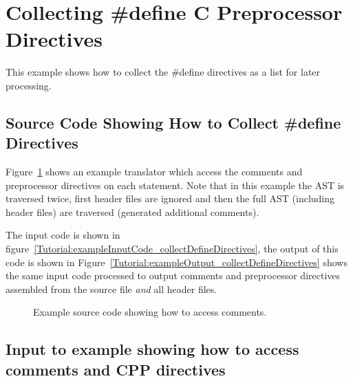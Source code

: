 \section{Collecting \#define C Preprocessor Directives}

   This example shows how to collect the \#define directives as
a list for later processing.

\subsection{Source Code Showing How to Collect \#define Directives}

    Figure~\ref{Tutorial:example_collectDefineDirectives}
shows an example translator which access the comments and preprocessor directives on each
statement. Note that in this example the AST is traversed twice, first header files are
ignored and then the full AST (including header files) are traversed (generated additional
comments).

The input code is shown in figure~\ref{Tutorial:exampleInputCode_collectDefineDirectives},
the output of this code is shown in 
Figure~\ref{Tutorial:exampleOutput_collectDefineDirectives} shows the
same input code processed to output comments and preprocessor directives assembled from 
the source file {\em and} all header files.

\begin{figure}[!h]
{\indent
{\mySmallFontSize

\begin{latexonly}
   
\end{latexonly}

\begin{htmlonly}
   
\end{htmlonly}

}
}
\caption{Example source code showing how to access comments. }
\label{Tutorial:example_collectDefineDirectives}
\end{figure}



\subsection{Input to example showing how to access comments and CPP directives}

